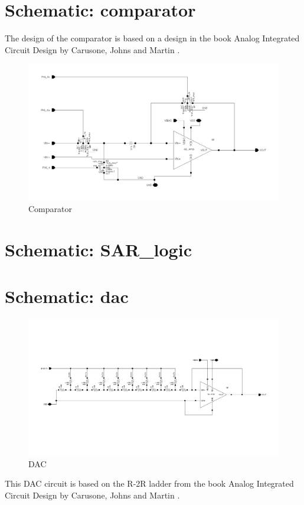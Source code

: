 \documentclass[english, a4paper,11pt]{article}
\begin{document}
\section*{Schematic: comparator}
The design of the comparator is based on a design in the book Analog Integrated Circuit Design by Carusone, Johns and Martin \cite{Analog-integrated}. 
\begin{figure}[!ht]
 \centering
   \includegraphics[width=\textwidth]{img/comparator}
   \caption{Comparator}
   \label{comparator}
\end{figure}
\section*{Schematic: SAR\_logic}
\section*{Schematic: dac}
\begin{figure}[!ht]
 \centering
   \includegraphics[width=\textwidth]{img/dac}
   \caption{DAC}
   \label{dac}
\end{figure}
This DAC circuit is based on the R-2R ladder from the book Analog Integrated Circuit Design by Carusone, Johns and Martin \cite{Analog-integrated}.
\end{document}
